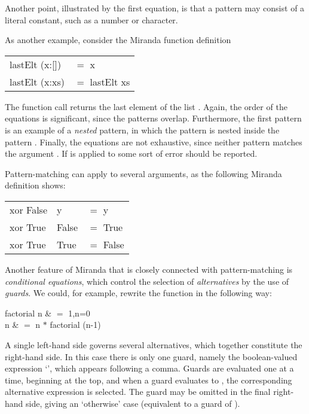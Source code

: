 Another point, illustrated by the first  equation, is that a pattern may consist of a literal constant, such as a number or character.

As another example, consider the Miranda function definition
\begin{mlcoded}
    \begin{tabular}{ll}
    lastElt (x:[]) &$=$ x\\
    lastElt (x:xs) &$=$ lastElt xs
    \end{tabular}
\end{mlcoded}
The function call  returns the last element of the list . Again, the order of the equations is significant, since the patterns overlap. Furthermore, the first pattern is an example of a \textit{nested} pattern, in which the pattern \ml{[\,]} is nested inside the pattern . Finally, the equations are not exhaustive, since neither pattern matches the argument \ml{[\,]}. If  is applied to \ml{[\,]} some sort of error should be reported.

Pattern-matching can apply to several arguments, as the following Miranda definition shows:
\begin{mlcoded}
    \begin{tabular}{lll}
    xor False &y &$=$ y\\
    xor True &False &$=$ True\\
    xor True &True &$=$ False
    \end{tabular}
\end{mlcoded}

Another feature of Miranda that is closely connected with pattern-matching is \textit{conditional equations}, which control the selection of \textit{alternatives} by the use of \textit{guards}. We could, for example, rewrite the  function in the following way:
\begin{mlalign}
    factorial n & $=$ 1,\qquad n=0\\
              n & $=$ n $*$ factorial (n-1)
\end{mlalign}
A single left-hand side governs several alternatives, which together constitute the right-hand side. In this case there is only one guard, namely the boolean-valued expression `', which appears following a comma. Guards are evaluated one at a time, beginning at the top, and when a guard evaluates to , the corresponding alternative expression is selected. The guard may be omitted in the final right-hand side, giving an `otherwise' case (equivalent to a guard of ).

